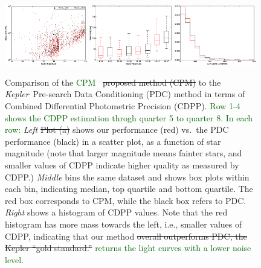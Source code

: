 \documentclass[12pt, preprint]{aastex}
\newcommand{\project}[1]{\textsl{#1}}
\newcommand{\Kepler}{\project{Kepler}}
\newcommand{\name}{CPM}
\newcommand{\revise}[1]{\textcolor{darkgreen}{#1}}
\newcommand{\remove}[1]{\sout{#1}}
\begin{document}
\begin{figure}[p]
\begin{center}
\includegraphics[width=0.32\textwidth]{f6j}
\includegraphics[width=0.32\textwidth]{f6k}
\includegraphics[width=0.32\textwidth]{f6l}
\end{center}
\caption{
  \label{cdpp} 
  Comparison of the \revise{\name\ } \remove{proposed method (\name) }to the \Kepler\ Pre-search Data Conditioning (PDC) method 
    in terms of Combined Differential Photometric Precision (CDPP).
  \revise{Row 1-4 shows the CDPP estimation throgh quarter 5 to quarter 8. In each row:} 
  \emph{Left} \remove{Plot (a)} shows our performance (red) vs.\ the PDC performance (black) in a scatter plot, as a function of star magnitude (note that larger magnitude means fainter stars, and smaller values of CDPP indicate higher quality as measured by CDPP.)
  \emph{Middle} bins the same dataset and shows box plots within each bin, indicating median, top quartile and bottom quartile. 
  The red box corresponds to \name, while the black box refers to PDC. 
  \emph{Right} shows a histogram of CDPP values. 
  Note that the red histogram has more mass towards the left, i.e., smaller values of CDPP, 
    indicating that our method \remove{overall outperforms PDC, the Kepler ``gold standard.'' } \revise{returns the light curves with a lower noise level.}
}
\end{figure}
\end{document}
